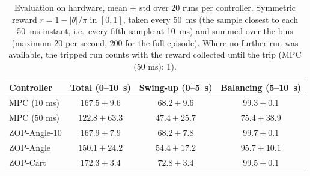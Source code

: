 \begin{table}[t]
  \centering
  \caption{Evaluation on hardware, mean $\pm$ std over 20 runs per controller. Symmetric reward $r = 1 - |\theta|/\pi$ in $[0, 1]$, taken every 50~ms (the sample closest to each 50~ms instant, i.e.\ every fifth sample at 10~ms) and summed over the bins (maximum 20 per second, 200 for the full episode). Where no further run was available, the tripped run counts with the reward collected until the trip (MPC (50 ms): 1).}
  \label{tab:eval_linear_sampled}
  \footnotesize
  \begin{tabular}{lccc}
    \toprule
    Controller & Total (0--10~s) & Swing-up (0--5~s) & Balancing (5--10~s) \\
    \midrule
    MPC (10 ms)    & $167.5 \pm 9.6$ & $68.2 \pm 9.6$ & $99.3 \pm 0.1$ \\
    MPC (50 ms)    & $122.8 \pm 63.3$ & $47.4 \pm 25.7$ & $75.4 \pm 38.9$ \\
    ZOP-Angle-10   & $167.9 \pm 7.9$ & $68.2 \pm 7.8$ & $\mathbf{99.7} \pm 0.1$ \\
    ZOP-Angle      & $150.1 \pm 24.2$ & $54.4 \pm 17.2$ & $95.7 \pm 10.1$ \\
    ZOP-Cart       & $\mathbf{172.3} \pm 3.4$ & $\mathbf{72.8} \pm 3.4$ & $99.5 \pm 0.1$ \\
    \bottomrule
  \end{tabular}
\end{table}
